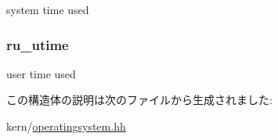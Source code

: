 system time used \hypertarget{structOperatingSystem_1_1rusage_a8215cefbae5cd231b1842dec70a931a4}{
\subsubsection[{ru\_\-utime}]{ {\bf ru\_\-utime}}}
\label{structOperatingSystem_1_1rusage_a8215cefbae5cd231b1842dec70a931a4}


user time used 

この構造体の説明は次のファイルから生成されました:\begin{DoxyCompactItemize}
\item 
kern/\hyperlink{operatingsystem_8hh}{operatingsystem.hh}\end{DoxyCompactItemize}
